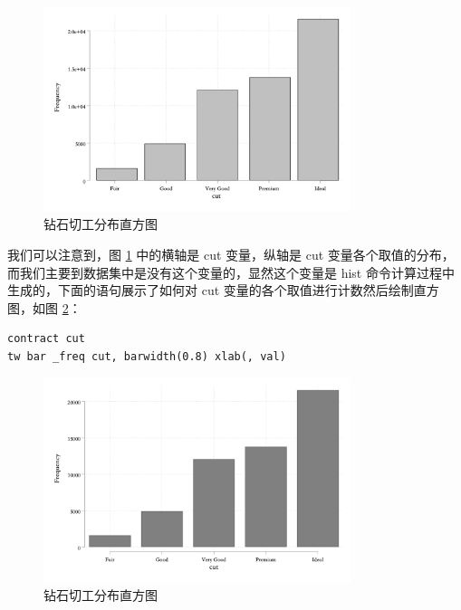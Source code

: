 \documentclass[]{ctexbook}
\begin{document}
\begin{figure}

{\centering \includegraphics[width=0.8\textwidth]{assets/histcut} 

}

\caption{钻石切工分布直方图}\label{fig:histcut}
\end{figure}

我们可以注意到，图 \ref{fig:histcut} 中的横轴是 cut 变量，纵轴是 cut 变量各个取值的分布，而我们主要到数据集中是没有这个变量的，显然这个变量是 hist 命令计算过程中生成的，下面的语句展示了如何对 cut 变量的各个取值进行计数然后绘制直方图，如图 \ref{fig:barcut}：

\begin{lstlisting}
contract cut
tw bar _freq cut, barwidth(0.8) xlab(, val)
\end{lstlisting}

\begin{figure}

{\centering \includegraphics[width=0.8\textwidth]{assets/barcut} 

}

\caption{钻石切工分布直方图}\label{fig:barcut}
\end{figure}
\end{document}
